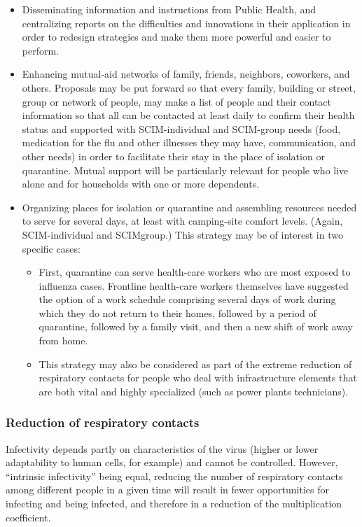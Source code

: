 \documentclass[12pt, a4]{scrartcl}
\begin{document}
\begin{itemize}
	\item Disseminating information and instructions from Public Health, and centralizing reports on the difficulties and innovations in their application in order to redesign strategies and make them more powerful and easier to perform.
	\item Enhancing mutual-aid networks of family, friends, neighbors, coworkers, and others. Proposals may be put forward so that every family, building or street, group or network of people, may make a list of people and their contact information so that all can be contacted at least daily to confirm their health status and supported with SCIM-individual and SCIM-group needs (food, medication for the flu and other illnesses they may have, communication, and other needs) in order to facilitate their stay in the place of isolation or quarantine. Mutual support will be particularly relevant for people who live alone and for households with one or more dependents. 
	\item Organizing places for isolation or quarantine and assembling resources needed to serve for several days, at least with camping-site comfort levels. (Again, SCIM-individual and SCIMgroup.) This strategy may be of interest in two specific cases:
\begin{itemize}
	\item First, quarantine can serve health-care workers who are most exposed to influenza cases. Frontline health-care workers themselves have suggested the option of a work schedule comprising several days of work during which they do not return to their homes, followed by a period of quarantine, followed by a family visit, and then a new shift of work away from home.
	\item This strategy may also be considered as part of the extreme reduction of respiratory contacts for people who deal with infrastructure elements that are both vital and highly specialized (such as power plants technicians).
\end{itemize}
\end{itemize}

\subsubsection{Reduction of respiratory contacts}
Infectivity depends partly on characteristics of the virus (higher or lower adaptability to human cells, for example) and cannot be controlled. However, “intrinsic infectivity” being equal, reducing the number of respiratory contacts among different people in a given time will result in fewer opportunities for infecting and being infected, and therefore in a reduction of the multiplication coefficient.
\end{document}
